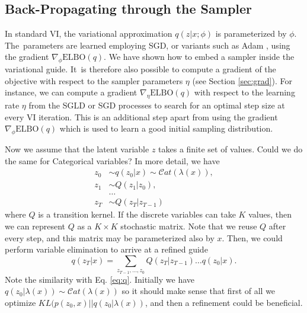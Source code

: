 \subsection{Back-Propagating through the Sampler}\label{sec:tuning}

In standard VI, the variational approximation $q(z|x;\phi)$ is parameterized by $\phi$. The~parameters are learned employing SGD, or variants such as Adam \cite{kingma2014adam}, using the gradient $\nabla_{\phi} \mbox{ELBO}(q)$. We have shown how to embed a sampler inside the variational guide. 
It~is therefore also possible to compute a gradient of the objective with respect to the sampler parameters $\eta$ (see Section \ref{sec:grad}). For instance, we can compute a gradient
$\nabla_{\eta} \mbox{ELBO}(q)$
with respect to the learning rate $\eta$ from the SGLD or SGD processes to search for an optimal step size at every VI iteration. This is an additional step apart from using the gradient $\nabla_{\phi} \mbox{ELBO}(q)$ which is used to learn a good initial sampling distribution.


\iffalse
Now we assume that the latent variable $z$ takes a finite set of values.
Could we do the same for Categorical variables?  In more detail, we have
\begin{align*}
z_0 &\sim q(z_0 | x) \sim \mathcal{C}at(\lambda({x})), \\
z_1 &\sim Q(z_1 | z_0), \\
&\ldots \\
z_{T} &\sim Q(z_T | z_{T-1})
\end{align*}
where $Q$ is a transition kernel. If the discrete variables can
take $K$ values, then we can represent $Q$ as a $K\times K$ stochastic
matrix. Note that we reuse $Q$ after every step, and this matrix 
may be parameterized also by ${x}$. Then, we could perform variable elimination to arrive at a refined guide 
$$
q(z_T | {x}) = \sum_{z_{T-1}, \ldots, z_0 } Q(z_T| z_{T-1}) \ldots q(z_0 | {x}).
$$
Note the similarity with Eq. \ref{eq:q}. Initially we have $q(z_0| \lambda(x)) \sim \mathcal{C}at(\lambda(x))$ so it should make sense that first of all we optimize $KL(p(z_0, x) || q(z_0 | \lambda(x))$, and then a refinement could be beneficial.

